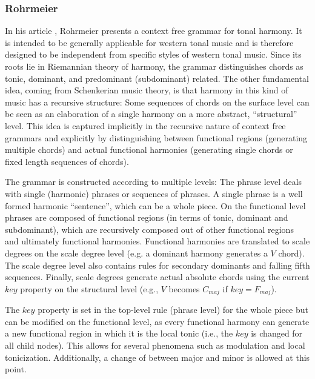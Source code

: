 \subsubsection{Rohrmeier}

In his article \autocite{rohrmeier_towards_2011}, Rohrmeier presents a context free grammar for tonal harmony.
It is intended to be generally applicable for western tonal music and is therefore designed to be independent from specific styles of western tonal music.
Since its roots lie in Riemannian theory of harmony, the grammar distinguishes chords as tonic, dominant, and predominant (subdominant) related.
The other fundamental idea, coming from Schenkerian music theory, is that harmony in this kind of music has a recursive structure:
Some sequences of chords on the surface level can be seen as an elaboration of a single harmony on a more abstract, ``structural'' level.
This idea is captured implicitly in the recursive nature of context free grammars and explicitly by distinguishing between functional regions (generating multiple chords) and actual functional harmonies (generating single chords or fixed length sequences of chords).

The grammar is constructed according to multiple levels:
The phrase level deals with single (harmonic) phrases or sequences of phrases.
A single phrase is a well formed harmonic ``sentence'', which can be a whole piece.
On the functional level phrases are composed of functional regions (in terms of tonic, dominant and subdominant), which are recursively composed out of other functional regions and ultimately functional harmonies.
Functional harmonies are translated to scale degrees on the scale degree level (e.g. a dominant harmony generates a $V$ chord).
The scale degree level also contains rules for secondary dominants and falling fifth sequences.
Finally, scale degrees generate actual absolute chords using the current $key$ property on the structural level (e.g., $V$ becomes $C_{maj}$ if $key = F_{maj}$).

The $key$ property is set in the top-level rule (phrase level) for the whole piece but can be modified on the functional level, as every functional harmony can generate a new functional region in which it is the local tonic (i.e., the $key$ is changed for all child nodes).
This allows for several phenomena such as modulation and local tonicization.
Additionally, a change of between major and minor is allowed at this point.

